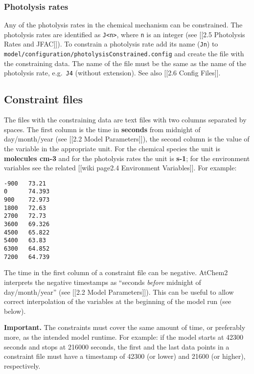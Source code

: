 \subsubsection{Photolysis rates} \label{photolysis-rates}

Any of the photolysis rates in the chemical mechanism can be
constrained. The photolysis rates are identified as
\texttt{J\textless{}n\textgreater{}}, where \texttt{n} is an integer
(see {[}{[}2.5 Photolysis Rates and JFAC{]}{]}). To constrain a
photolysis rate add its name (\texttt{Jn}) to
\texttt{model/configuration/photolysisConstrained.config} and create
the file with the constraining data. The name of the file must be the
same as the name of the photolysis rate, e.g.~\texttt{J4} (without
extension). See also {[}{[}2.6 Config Files{]}{]}.

\subsection{Constraint files} \label{subsec:constraint-files}

The files with the constraining data are text files with two columns
separated by spaces. The first column is the time in \textbf{seconds}
from midnight of day/month/year (see {[}{[}2.2 Model
Parameters{]}{]}), the second column is the value of the variable in
the appropriate unit.  For the chemical species the unit is
\textbf{molecules cm-3} and for the photolysis rates the unit is
\textbf{s-1}; for the environment variables see the related {[}{[}wiki
page\textbar{}2.4 Environment Variables{]}{]}. For example:

\begin{verbatim}
-900   73.21
0      74.393
900    72.973
1800   72.63
2700   72.73
3600   69.326
4500   65.822
5400   63.83
6300   64.852
7200   64.739
\end{verbatim}

The time in the first column of a constraint file can be negative.
AtChem2 interprets the negative timestamps as ``seconds \emph{before}
midnight of day/month/year'' (see {[}{[}2.2 Model Parameters{]}{]}).
This can be useful to allow correct interpolation of the variables at
the beginning of the model run (see below).

\textbf{Important.} The constraints must cover the same amount of
time, or preferably more, as the intended model runtime. For example:
if the model starts at 42300 seconds and stops at 216000 seconds, the
first and the last data points in a constraint file must have a
timestamp of 42300 (or lower) and 21600 (or higher), respectively.

